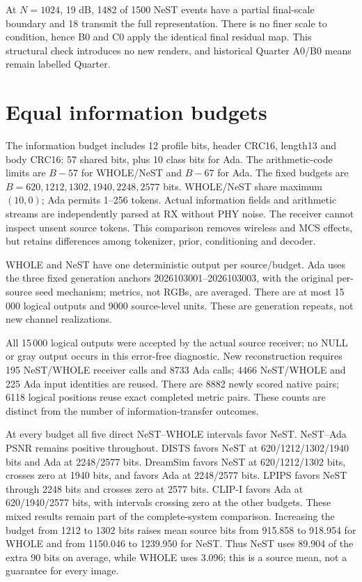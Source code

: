 \documentclass[10pt,letterpaper]{article}
\begin{document}
At $N=1024$, 19 dB, 1482 of 1500 NeST events have a partial final-scale boundary and 18 transmit the full representation. There is no finer scale to condition, hence B0 and C0 apply the identical final residual map. This structural check introduces no new renders, and historical Quarter A0/B0 means remain labelled Quarter.

\section{Equal information budgets}
The information budget includes 12 profile bits, header CRC16, length13 and body CRC16: 57 shared bits, plus 10 class bits for Ada. The arithmetic-code limits are $B-57$ for WHOLE/NeST and $B-67$ for Ada. The fixed budgets are $B=620,1212,1302,1940,2248,2577$ bits. WHOLE/NeST share maximum $(10,0)$; Ada permits 1--256 tokens. Actual information fields and arithmetic streams are independently parsed at RX without PHY noise. The receiver cannot inspect unsent source tokens. This comparison removes wireless and MCS effects, but retains differences among tokenizer, prior, conditioning and decoder.

WHOLE and NeST have one deterministic output per source/budget. Ada uses the three fixed generation anchors 2026103001--2026103003, with the original per-source seed mechanism; metrics, not RGBs, are averaged. There are at most 15\,000 logical outputs and 9000 source-level units. These are generation repeats, not new channel realizations.

All 15\,000 logical outputs were accepted by the actual source receiver; no NULL or gray output occurs in this error-free diagnostic. New reconstruction requires 195 NeST/WHOLE receiver calls and 8733 Ada calls; 4466 NeST/WHOLE and 225 Ada input identities are reused. There are 8882 newly scored native pairs; 6118 logical positions reuse exact completed metric pairs. These counts are distinct from the number of information-transfer outcomes.

At every budget all five direct NeST--WHOLE intervals favor NeST. NeST--Ada PSNR remains positive throughout. DISTS favors NeST at 620/1212/1302/1940 bits and Ada at 2248/2577 bits. DreamSim favors NeST at 620/1212/1302 bits, crosses zero at 1940 bits, and favors Ada at 2248/2577 bits. LPIPS favors NeST through 2248 bits and crosses zero at 2577 bits. CLIP-I favors Ada at 620/1940/2577 bits, with intervals crossing zero at the other budgets. These mixed results remain part of the complete-system comparison. Increasing the budget from 1212 to 1302 bits raises mean source bits from 915.858 to 918.954 for WHOLE and from 1150.046 to 1239.950 for NeST. Thus NeST uses 89.904 of the extra 90 bits on average, while WHOLE uses 3.096; this is a source mean, not a guarantee for every image.
\end{document}
